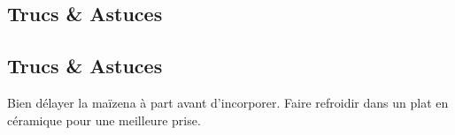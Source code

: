     \vspace{1cm}
    \hline
    \vspace{1cm}
    
    \subsection{Trucs \& Astuces}
        \subsection{Trucs \& Astuces}
	Bien délayer la maïzena à part avant d'incorporer. Faire refroidir dans un plat en céramique pour une meilleure prise.
